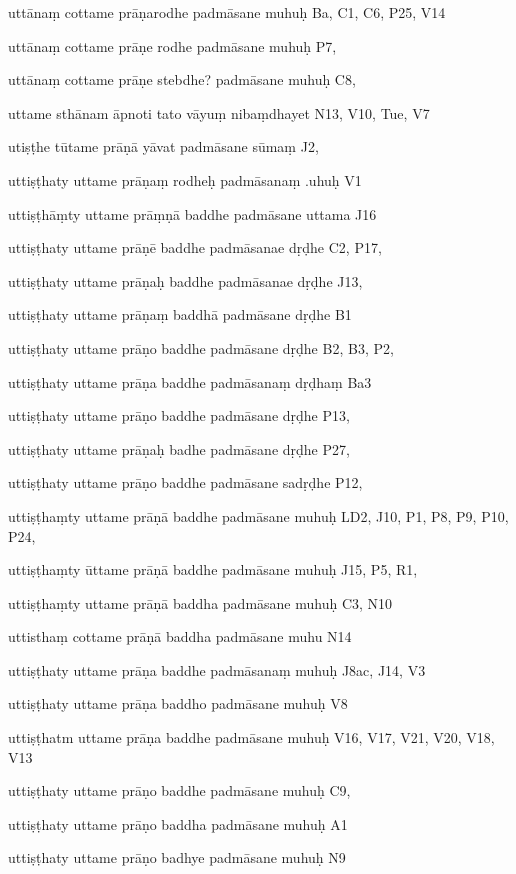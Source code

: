 \begin{ekdosis}
\begin{marma}[hp01_055]
\begin{marma}[hp02_009]
\begin{marma}[hp02_011]
 \begin{marma}[hp02_012]
\item[uttānaṃ cottame prāṇarodhe padmāsane muhuḥ] Ba, C1, C6, P25, V14
\item[uttānaṃ cottame prāṇe rodhe padmāsane muhuḥ] P7, 
\item[uttānaṃ cottame prāṇe stebdhe? padmāsane muhuḥ] C8,
\item[uttame sthānam āpnoti tato vāyuṃ nibaṃdhayet] N13, V10, Tue, V7
\item[utiṣṭhe tūtame prāṇā yāvat padmāsane sūmaṃ] J2,
\item[uttiṣṭhaty uttame prāṇaṃ rodheḥ padmāsanaṃ .uhuḥ] V1
\item[uttiṣṭhāṃty uttame prāṃṇā baddhe padmāsane uttama] J16
\item[uttiṣṭhaty uttame prāṇē baddhe padmāsanae dṛḍhe] C2, P17, 
\item[uttiṣṭhaty uttame prāṇaḥ baddhe padmāsanae dṛḍhe] J13,
\item[uttiṣṭhaty uttame prāṇaṃ baddhā padmāsane dṛḍhe] B1
\item[uttiṣṭhaty uttame prāṇo baddhe padmāsane dṛḍhe] B2, B3, P2,
\item[uttiṣṭhaty uttame prāṇa baddhe padmāsanaṃ dṛḍhaṃ] Ba3
\item[uttiṣṭhaty uttame prāṇo baddhe padmāsane dṛḍhe] P13, 
\item[uttiṣṭhaty uttame prāṇaḥ badhe padmāsane dṛḍhe] P27,
\item[uttiṣṭhaty uttame prāṇo baddhe padmāsane sadṛḍhe] P12,
\item[uttiṣṭhaṃty uttame prāṇā baddhe padmāsane muhuḥ] LD2, J10, P1, P8, P9, P10, P24, 
\item[uttiṣṭhaṃty ūttame prāṇā baddhe padmāsane muhuḥ] J15, P5, R1, 
\item[uttiṣṭhaṃty uttame prāṇā baddha padmāsane muhuḥ] C3, N10
\item[uttisthaṃ cottame prāṇā baddha padmāsane muhu] N14
\item[uttiṣṭhaty uttame prāṇa baddhe padmāsanaṃ muhuḥ] J8ac, J14, V3
\item[uttiṣṭhaty uttame prāṇa baddho padmāsane muhuḥ] V8
\item[uttiṣṭhatm uttame prāṇa baddhe padmāsane muhuḥ] V16, V17, V21, V20, V18, V13
\item[uttiṣṭhaty uttame prāṇo baddhe padmāsane muhuḥ] C9, 
\item[uttiṣṭhaty uttame prāṇo baddha padmāsane muhuḥ] A1
\item[uttiṣṭhaty uttame prāṇo badhye padmāsane muhuḥ] N9

\end{marma}
\end{marma}
\end{marma}
\end{marma}
\end{ekdosis}
